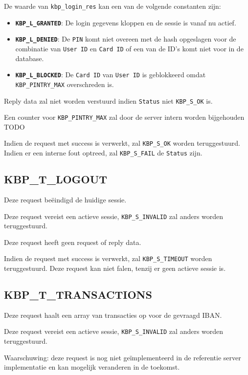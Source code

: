 \documentclass[11pt,a4paper]{article}
\begin{document}
De waarde van \texttt{kbp\_login\_res} kan een van de volgende constanten zijn:
\begin{itemize}
	\item \textbf{\texttt{KBP\_L\_GRANTED}}: De login gegevens kloppen en de
		sessie is vanaf nu actief.
	\item \textbf{\texttt{KBP\_L\_DENIED}}: De \texttt{PIN} komt niet
		overeen met de hash opgeslagen voor de combinatie van
		\texttt{User ID} en \texttt{Card ID} of een van de ID's komt
		niet voor in de database.
	\item \textbf{\texttt{KBP\_L\_BLOCKED}}: De \texttt{Card ID} van
		\texttt{User ID} is geblokkeerd omdat \texttt{KBP\_PINTRY\_MAX}
		overschreden is.
\end{itemize}

Reply data zal niet worden verstuurd indien \texttt{Status} niet
\texttt{KBP\_S\_OK} is.

Een counter voor \texttt{KBP\_PINTRY\_MAX} zal door de server intern worden
bijgehouden TODO

Indien de request met success is verwerkt, zal \texttt{KBP\_S\_OK} worden
teruggestuurd. Indien er een interne fout optreed, zal \texttt{KBP\_S\_FAIL} de
\texttt{Status} zijn.

\subsection{KBP\_T\_LOGOUT}
Deze request beëindigd de huidige sessie.

Deze request vereist een actieve sessie, \texttt{KBP\_S\_INVALID} zal anders
worden teruggestuurd.

Deze request heeft geen request of reply data.

Indien de request met success is verwerkt, zal \texttt{KBP\_S\_TIMEOUT} worden
teruggestuurd. Deze request kan niet falen, tenzij er geen actieve sessie is.

\subsection{KBP\_T\_TRANSACTIONS}
Deze request haalt een array van transacties op voor de gevraagd IBAN.

Deze request vereist een actieve sessie, \texttt{KBP\_S\_INVALID} zal anders
worden teruggestuurd.

Waarschuwing: deze request is nog niet geïmplementeerd in de referentie server
implementatie en kan mogelijk veranderen in de toekomst.
\end{document}
